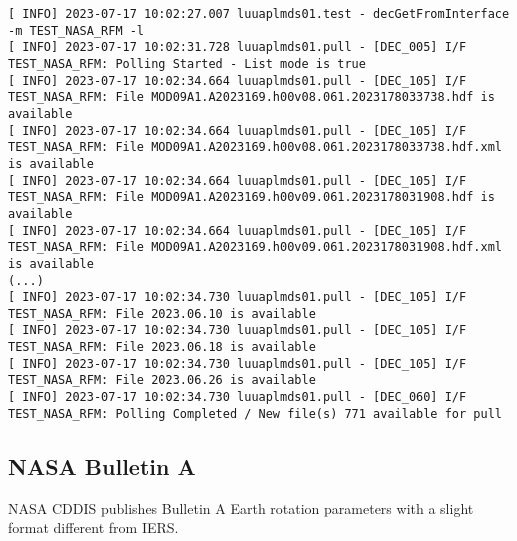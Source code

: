 \documentclass[dec_sum_main.tex]{subfiles}
\begin{document}

\begin{Verbatim}[fontsize=\tiny]
[ INFO] 2023-07-17 10:02:27.007 luuaplmds01.test - decGetFromInterface -m TEST_NASA_RFM -l
[ INFO] 2023-07-17 10:02:31.728 luuaplmds01.pull - [DEC_005] I/F TEST_NASA_RFM: Polling Started - List mode is true
[ INFO] 2023-07-17 10:02:34.664 luuaplmds01.pull - [DEC_105] I/F TEST_NASA_RFM: File MOD09A1.A2023169.h00v08.061.2023178033738.hdf is available
[ INFO] 2023-07-17 10:02:34.664 luuaplmds01.pull - [DEC_105] I/F TEST_NASA_RFM: File MOD09A1.A2023169.h00v08.061.2023178033738.hdf.xml is available
[ INFO] 2023-07-17 10:02:34.664 luuaplmds01.pull - [DEC_105] I/F TEST_NASA_RFM: File MOD09A1.A2023169.h00v09.061.2023178031908.hdf is available
[ INFO] 2023-07-17 10:02:34.664 luuaplmds01.pull - [DEC_105] I/F TEST_NASA_RFM: File MOD09A1.A2023169.h00v09.061.2023178031908.hdf.xml is available
(...)
[ INFO] 2023-07-17 10:02:34.730 luuaplmds01.pull - [DEC_105] I/F TEST_NASA_RFM: File 2023.06.10 is available
[ INFO] 2023-07-17 10:02:34.730 luuaplmds01.pull - [DEC_105] I/F TEST_NASA_RFM: File 2023.06.18 is available
[ INFO] 2023-07-17 10:02:34.730 luuaplmds01.pull - [DEC_105] I/F TEST_NASA_RFM: File 2023.06.26 is available
[ INFO] 2023-07-17 10:02:34.730 luuaplmds01.pull - [DEC_060] I/F TEST_NASA_RFM: Polling Completed / New file(s) 771 available for pull
\end{Verbatim}


\subsection{NASA Bulletin A}
NASA CDDIS publishes Bulletin A Earth rotation parameters with a slight format different from IERS.\newline

 \newline
\end{document}

